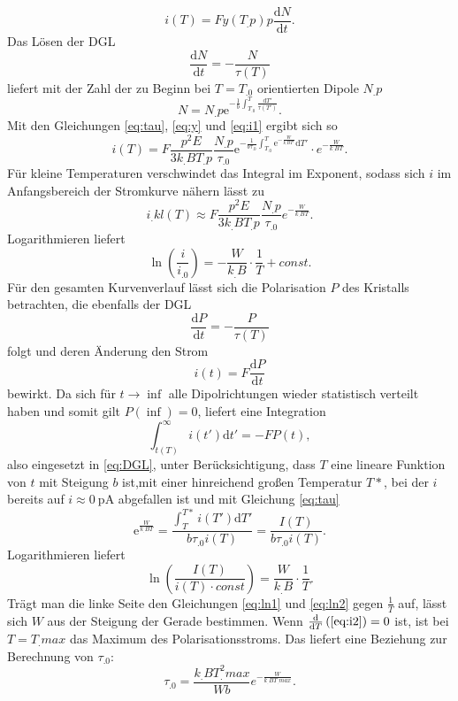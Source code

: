 \begin{equation}
i(T)=F y(T_.p)p\frac{\mathrm{d}N}{\mathrm{d}t}\text{.}\label{eq:i1}
\end{equation}
Das Lösen der DGL
\[
\frac{\mathrm{d}N}{\mathrm{d}t}=-\frac{N}{\tau(T)}
\]
liefert mit der Zahl der zu Beginn bei $T=T_.0$ orientierten Dipole $N_.p$
\begin{equation}
N=N_.p\mathrm{e}^{-\frac{1}{b}\int_{T_.0}^T\frac{\mathrm{d}T'}{\tau(T')}}\text{.}\label{eq:N}
\end{equation}
Mit den Gleichungen \eqref{eq:tau}, \eqref{eq:y} und \eqref{eq:i1} ergibt sich so
\begin{equation}
i(T)=F\frac{p^2E}{3k_.BT_.p}\frac{N_.p}{\tau_.0}\mathrm{e}^{-\frac{1}{b\tau_.0}\int_{T_.0}^T\mathrm{e}^{-\frac{W}{k_.BT'}}\mathrm{d}T'}\cdot e^{-\frac{W}{k_.BT}}\text{.}\label{eq:i2}
\end{equation}
Für kleine Temperaturen verschwindet das Integral im Exponent, sodass sich $i$ im Anfangsbereich der Stromkurve nähern lässt zu
\begin{equation}
i_.{kl}(T)\approx F\frac{p^2E}{3k_.BT_.p}\frac{N_.p}{\tau_.0}e^{-\frac{W}{k_.BT}}\text{.}\label{eq:i_kl}
\end{equation}
Logarithmieren liefert 
\begin{equation}
\ln\left(\frac{i}{i_.0}\right)=-\frac{W}{k_.B}\cdot\frac{1}{T}+const\text{.}\label{eq:ln1}
\end{equation}
Für den gesamten Kurvenverlauf lässt sich die Polarisation $P$ des Kristalls betrachten, die ebenfalls der DGL
\begin{equation}
\frac{\mathrm{d}P}{\mathrm{d}t}=-\frac{P}{\tau(T)}\label{eq:DGL}
\end{equation}
folgt und deren Änderung den Strom
\[
i(t)=F\frac{\mathrm{d}P}{\mathrm{d}t}
\]
bewirkt. Da sich für $t\rightarrow\inf$ alle Dipolrichtungen wieder statistisch verteilt haben und somit gilt $P(\inf)=0$, liefert eine Integration
\[
\int_{t(T)}^{\infty}i(t')\mathrm{d}t'=-F P(t),
\]
also eingesetzt in \eqref{eq:DGL}, unter Berücksichtigung, dass $T$ eine lineare Funktion von $t$ mit Steigung $b$ ist,mit einer hinreichend großen Temperatur $T*$, bei der $i$ bereits auf $i\approx\SI{0}{\pico\ampere}$ abgefallen ist und mit Gleichung \eqref{eq:tau}
\begin{equation}
\mathrm{e}^{\frac{W}{k_.BT}}=\frac{\int_{T}^{T*}i(T')\mathrm{d}T'}{b\tau_.0 i(T)}=\frac{I(T)}{b\tau_.0 i(T)}\text{.}\label{eq:i3}
\end{equation}
Logarithmieren liefert
\begin{equation}
\ln\left(\frac{I(T)}{i(T)\cdot const}\right)=\frac{W}{k_.B}\cdot\frac{1}{T}\text{.}\label{eq:ln2}
\end{equation}
Trägt man die linke Seite den Gleichungen \eqref{eq:ln1} und \eqref{eq:ln2} gegen $\frac{1}{T}$ auf, lässt sich $W$ aus der Steigung der Gerade bestimmen.
Wenn $\frac{\mathrm{d}}{\mathrm{d}T}\left(\eqref{eq:i2}\right)=0$ ist, ist bei $T=T_.max$ das Maximum des Polarisationsstroms.
Das liefert eine Beziehung zur Berechnung von $\tau_.0$:
\begin{equation}
\tau_.0=\frac{k_.BT^2_.{max}}{W b}e^{-\frac{W}{k_.BT_.{max}}}\text{.}\label{eq:tau0}
\end{equation}


